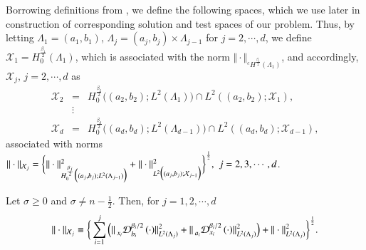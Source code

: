 Borrowing definitions from \cite{samiee2016}, we define the following spaces, which we use later in construction of corresponding solution and test spaces of our problem. Thus, by letting $\Lambda_1 = (a_1,b_1)$, $\Lambda_j = (a_j,b_j) \times \Lambda_{j-1}$ for $j=2,\cdots,d$, we define $\mathcal{X}_1 = H^{\frac{\beta_1}{2}}_{0}(\Lambda_1)$, which is associated with the norm $ \Vert \cdot \Vert_{{^c}H^{\frac{\beta_1}{2}}_{}(\Lambda_1)}$, and accordingly, $\mathcal{X}_j, \, j=2,\cdots,d$ as
%
\begin{eqnarray}
%
\mathcal{X}_2 &=& H^{\frac{\beta_2}{2}}_0 \Big((a_2,b_2); L^2(\Lambda_1) \Big) \cap L^2((a_2,b_2); \mathcal{X}_1),
\\
&\vdots&
\nonumber
\\
\mathcal{X}_d &=& H^{\frac{\beta_d}{2}}_0 \Big((a_d,b_d); L^2(\Lambda_{d-1}) \Big) \cap L^2((a_d,b_d); \mathcal{X}_{d-1}),
%
\end{eqnarray}
%
associated with norms $\Vert \cdot \Vert_{\mathcal{X}_j} = \bigg{\{} \Vert \cdot \Vert_{H^{\frac{\beta_j}{2}}_0 \Big((a_j,b_j); L^2(\Lambda_{j-1}) \Big)}^2 + \Vert \cdot \Vert_{ L^2\Big((a_j,b_j); \mathcal{X}_{j-1}\Big)}^2 \bigg{\}}^{\frac{1}{2}}, \,\, j=2,3,\cdots,d$.

\vspace{0.1 in}
%
\begin{lem}
	\label{space norm 1}
	Let $\sigma \geq 0$ and $\sigma \neq n-\frac{1}{2}$. Then, for $j=1,2,\cdots,d$ 
	\begin{align*}
	\Vert \cdot \Vert_{\mathcal{X}_j} \equiv \bigg{\{}  \sum_{i=1}^{j} \Big(\Vert \prescript{}{x_i}{\mathcal{D}}_{b_i}^{\beta_i/2}\, (\cdot)\Vert_{L^2(\Lambda_j)}^2+\Vert \prescript{}{a_i}{\mathcal{D}}_{x_i}^{\beta_i/2}\, (\cdot)\Vert_{L^2(\Lambda_j)}^2 \Big) + \Vert  \cdot \Vert_{L^2(\Lambda_j)}^2 \bigg{\}}^{\frac{1}{2}}.
	\end{align*}
\end{lem}
%




%
